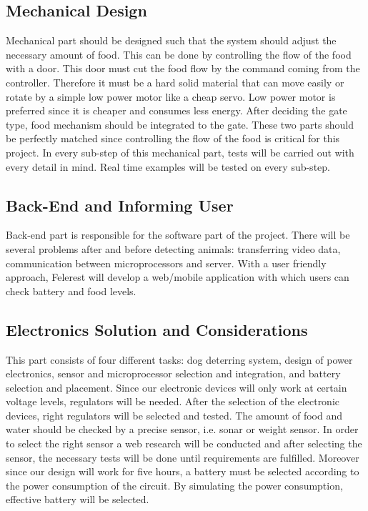 \subsection{Mechanical Design}
Mechanical part should be designed such that the system should adjust the necessary amount of food. This can be done by controlling the flow of the food with a door. This door must cut the food flow by the command coming from the controller. Therefore it must be a hard solid material that can move easily or rotate by a simple low power motor like a cheap servo\cite{cite:cheapservo}. Low power motor is preferred  since it is cheaper and consumes less energy. After deciding the gate type, food mechanism should be integrated to the gate. These two parts should be perfectly matched since controlling the flow of the food is critical for this project. In every sub-step of this mechanical part, tests will be carried out with every detail in mind. Real time examples will be tested on every sub-step.

\subsection{Back-End and Informing User}
Back-end part is responsible for the software part of the project. There will be several problems after and before detecting animals: transferring video data, communication between microprocessors and server. With a user friendly approach, Felerest will develop a web/mobile application with which users can check battery and food levels.

\subsection{Electronics Solution and Considerations}
This part consists of four different tasks: dog deterring system, design of power electronics, sensor and microprocessor selection and integration, and battery selection and placement. Since our electronic devices will only work at certain voltage levels, regulators will be needed. After the selection of the electronic devices, right regulators will be selected and tested. The amount of food and water should be checked by a precise sensor, i.e. sonar or weight sensor. In order to select the right sensor a web research will be conducted and after selecting the sensor, the necessary tests will be done until requirements are fulfilled. Moreover since our design will work for five hours, a battery must be selected according to the power consumption of the circuit. By simulating the power consumption, effective battery will be selected.

